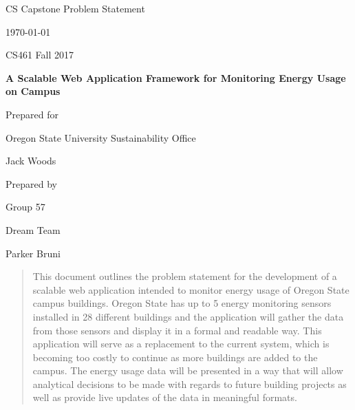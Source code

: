 \documentclass[onecolumn, draftclsnofoot,10pt, compsoc]{IEEEtran}
\def \CapstoneTeamName{			Dream Team}
\def \CapstoneTeamNumber{		57}
\def \GroupMemberOne{			Parker Bruni}
\def \GroupMemberTwo{			Daniel Schroeder}
\def \GroupMemberThree{			Aubrey Thennell}
\def \CapstoneProjectName{		A Scalable Web Application Framework for Monitoring Energy Usage on Campus}
\def \CapstoneSponsorCompany{	Oregon State University Sustainability Office}
\def \CapstoneSponsorPerson{	Jack Woods}
\def \DocType{		Problem Statement
				}
\newcommand{\NameSigPair}[1]{\par
\makebox[2.75in][r]{#1} \hfil 	\makebox[3.25in]{\makebox[2.25in]{\hrulefill} \hfill		\makebox[.75in]{\hrulefill}}
\par\vspace{-12pt} \textit{\tiny\noindent
\makebox[2.75in]{} \hfil		\makebox[3.25in]{\makebox[2.25in][r]{Signature} \hfill	\makebox[.75in][r]{Date}}}}
\renewcommand{\NameSigPair}[1]{#1}
\begin{document}
\begin{titlepage}
    \begin{singlespace}
        \hfill 
        \par\vspace{.2in}
        \centering
        \scshape{
            \huge CS Capstone \DocType \par
            {\large\today}\par
			{\large CS461 Fall 2017}\par
            \vspace{.5in}
            \textbf{\Huge\CapstoneProjectName}\par
            \vfill
            {\large Prepared for}\par
            \Huge \CapstoneSponsorCompany\par
            \vspace{5pt}
            {\Large\NameSigPair{\CapstoneSponsorPerson}\par}
            {\large Prepared by }\par
            Group\CapstoneTeamNumber\par
            \CapstoneTeamName\par 
            \vspace{5pt}
            {\Large
                \NameSigPair{\GroupMemberOne}\par
            }
            \vspace{20pt}
        }
        \begin{abstract}
        	This document outlines the problem statement for the development of a scalable web application intended to monitor
			energy usage of Oregon State campus buildings. Oregon State has up to 5 energy monitoring sensors installed in 28 different buildings 
			and the application will gather the data from those sensors and display it in a formal and readable way.  This application will serve as a replacement
			to the current system, which is becoming too costly to continue as more buildings are added to the campus.
			The energy usage data will be presented in a way that will allow analytical decisions to be made with regards to 
			future building projects as well as provide live updates of the data in meaningful formats.
        \end{abstract}     
    \end{singlespace}
\end{titlepage}
\newpage
{}
\tableofcontents
\clearpage
\end{document}
